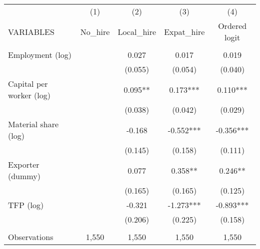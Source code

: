 \begin{tabular}{lcccc} \hline
 & (1) & (2) & (3) & (4) \\
VARIABLES & No\_hire & Local\_hire & Expat\_hire & Ordered logit \\ \hline
 &  &  &  &  \\
Employment (log) &  & 0.027 & 0.017 & 0.019 \\
 &  & (0.055) & (0.054) & (0.040) \\
Capital per worker (log) &  & 0.095** & 0.173*** & 0.110*** \\
 &  & (0.038) & (0.042) & (0.029) \\
Material share (log) &  & -0.168 & -0.552*** & -0.356*** \\
 &  & (0.145) & (0.158) & (0.111) \\
Exporter (dummy) &  & 0.077 & 0.358** & 0.246** \\
 &  & (0.165) & (0.165) & (0.125) \\
TFP (log) &  & -0.321 & -1.273*** & -0.893*** \\
 &  & (0.206) & (0.225) & (0.158) \\
 &  &  &  &  \\
 Observations & 1,550 & 1,550 & 1,550 & 1,550 \\ \hline
\end{tabular}
